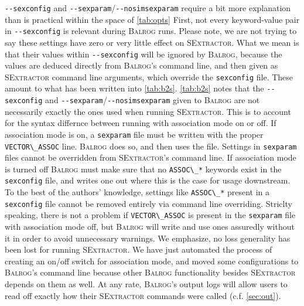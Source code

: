 \documentclass[12pt]{book}
\newcommand{\codett}[1]{\lstinline{#1}}
\newcommand{\balrog}{\textsc{Balrog}}
\newcommand{\sex}{\textsc{SExtractor}}
\newcommand{\opt}[1]{\codett{--#1}}
\begin{document}
\opt{sexconfig} and \opt{sexparam}/\opt{nosimsexparam} require a bit more explanation than is practical
within the space of \autoref{tab:opts}
First, not every keyword-value pair in \opt{sexconfig} is relevant during \balrog{} runs.
Please note, we are not trying to say these settings have zero or very little effect on \sex{}.
What we mean is that their values within \opt{sexconfig} will be ignored by \balrog{}, because
the values are deduced directly from \balrog{}'s command line, and then 
given as \sex{} command line arguments, which override the \codett{sexconfig} file.
These amount to what has been written into \autoref{tab:b2s}.
\autoref{tab:b2s} notes that the \opt{sexconfig} and \opt{sexparam}/\opt{nosimsexparam} given to \balrog{}
are not necessarily exactly the ones used when running \sex{}.
This is to account for the syntax differnce between running with association mode on or off.
If association mode is on, a \codett{sexparam} file must be written with the proper \codett{VECTOR\_ASSOC} line.
\balrog{} does so, and then uses the file. Settings in \codett{sexparam} files cannot be overridden from \sex{}'s command line.
If association mode is turned off \balrog{} must make sure that no \codett{ASSOC\_*} keywords exist in the \codett{sexconfig} file,
and writes one out where this is the case for usage downstream. To the best of the authors' knowledge,
settings like \codett{ASSOC\_*} present in a \codett{sexconfig} file cannot be removed entirely via command line overriding.
Striclty speaking, there is not a problem if \codett{VECTOR\_ASSOC} is present in the \codett{sexparam} file with association
mode off, but \balrog{} will write and use ones assuredly without it in order to avoid unnecessary warnings.
We emphasize, no loss generality has been lost for running \sex{}.
We have just automated the process of creating an on/off switch for association mode, and moved some
configurations to \balrog{}'s command line because other \balrog{} functionality besides \sex{} depends on them as well.
At any rate, \balrog{}'s output logs will allow users to read off exactly how their \sex{} commands were called (c.f. \autoref{sec:out}).

\newpage
\optstab{}
\end{document}
